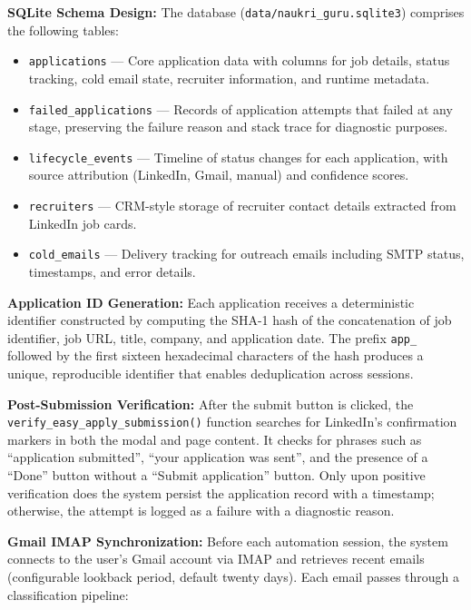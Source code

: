 \documentclass[12pt, a4paper, oneside]{report}
\begin{document}
\textbf{SQLite Schema Design:} The database (\texttt{data/naukri\_guru.sqlite3}) comprises the following tables:

\begin{itemize}
    \item \texttt{applications} --- Core application data with columns for job details, status tracking, cold email state, recruiter information, and runtime metadata.
    \item \texttt{failed\_applications} --- Records of application attempts that failed at any stage, preserving the failure reason and stack trace for diagnostic purposes.
    \item \texttt{lifecycle\_events} --- Timeline of status changes for each application, with source attribution (LinkedIn, Gmail, manual) and confidence scores.
    \item \texttt{recruiters} --- CRM-style storage of recruiter contact details extracted from LinkedIn job cards.
    \item \texttt{cold\_emails} --- Delivery tracking for outreach emails including SMTP status, timestamps, and error details.
\end{itemize}

\textbf{Application ID Generation:} Each application receives a deterministic identifier constructed by computing the SHA-1 hash of the concatenation of job identifier, job URL, title, company, and application date. The prefix \texttt{app\_} followed by the first sixteen hexadecimal characters of the hash produces a unique, reproducible identifier that enables deduplication across sessions.

\textbf{Post-Submission Verification:} After the submit button is clicked, the \texttt{verify\_easy\_apply\_submission()} function searches for LinkedIn's confirmation markers in both the modal and page content. It checks for phrases such as ``application submitted'', ``your application was sent'', and the presence of a ``Done'' button without a ``Submit application'' button. Only upon positive verification does the system persist the application record with a timestamp; otherwise, the attempt is logged as a failure with a diagnostic reason.

\textbf{Gmail IMAP Synchronization:} Before each automation session, the system connects to the user's Gmail account via IMAP and retrieves recent emails (configurable lookback period, default twenty days). Each email passes through a classification pipeline:
\end{document}
